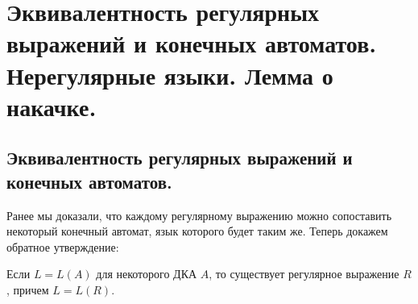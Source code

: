 \documentclass[a4paper,12pt]{article}
\begin{document}
\section{Эквивалентность регулярных выражений и конечных автоматов. Нерегулярные языки. Лемма о накачке.}
	\subsection{Эквивалентность регулярных выражений и конечных автоматов.}
	Ранее мы доказали, что каждому регулярному выражению можно сопоставить некоторый конечный автомат, язык которого будет таким же. Теперь докажем обратное утверждение:
	\begin{theorem}
		Если $L = L(A)$ для некоторого ДКА $A$, то существует регулярное выражение $R$, причем $L = L(R)$.
	\end{theorem}
\end{document}
